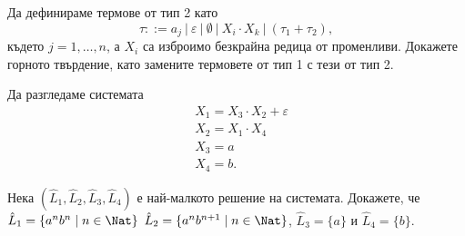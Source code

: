 \begin{problem}
  Да дефинираме термове от тип 2 като
  \[\tau ::= a_j\ |\ \varepsilon\ |\ \emptyset\ |\ X_i \cdot X_k\ |\ (\tau_1 + \tau_2),\]
  където $j = 1, \dots,n$, а $X_i$ са изброимо безкрайна редица от променливи.
  Докажете горното твърдение, като замените термовете от тип 1 с тези от тип 2.
\end{problem}

\begin{example}
  Да разгледаме системата
  \begin{align*}
    & X_1 = X_3 \cdot X_2 + \varepsilon\\
    & X_2 = X_1 \cdot X_4\\
    & X_3 = a\\
    & X_4 = b.
  \end{align*}


  Нека $(\hat{L}_1, \hat{L}_2, \hat{L}_3, \hat{L}_4)$ е най-малкото решение на системата.
  Докажете, че $\hat{L}_1 = \{a^nb^n\mid n \in \Nat\}$ $\hat{L}_2 = \{a^nb^{n+1}\mid n \in \Nat\}$,
  $\hat{L}_3 = \{a\}$ и $\hat{L}_4 = \{b\}$.
\end{example}



